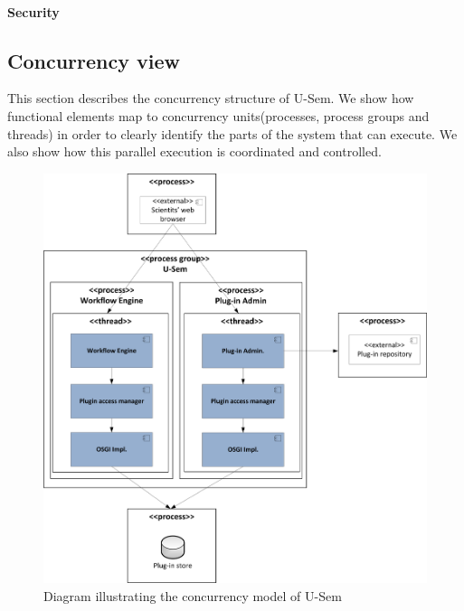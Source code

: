 \paragraph{Security}

\subsection{Concurrency view}

This section describes the concurrency structure of U-Sem. We show how functional elements map to concurrency units(processes, process groups and threads) in order to clearly identify the parts of the system that can execute. We also show how this parallel execution is coordinated and controlled.

\begin{figure}[h!]
  \centering
  	\includegraphics[scale=0.70]{plug-in/layers/concur.png}
  \caption{Diagram illustrating the concurrency model of U-Sem}
  \label{fig_conc}
\end{figure}

